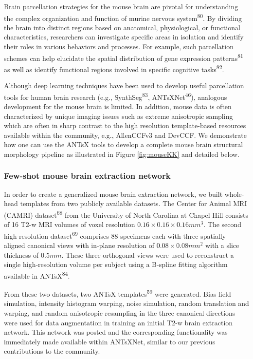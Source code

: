 \documentclass[
  12pt,
]{article}
\begin{document}
Brain parcellation strategies for the mouse brain are pivotal for
understanding the complex organization and function of murine nervous
system\textsuperscript{80}. By dividing the brain into distinct regions
based on anatomical, physiological, or functional characteristics,
researchers can investigate specific areas in isolation and identify
their roles in various behaviors and processes. For example, such
parcellation schemes can help elucidate the spatial distribution of gene
expression patterns\textsuperscript{81} as well as identify functional
regions involved in specific cognitive tasks\textsuperscript{82}.

Although deep learning techniques have been used to develop useful
parcellation tools for human brain research (e.g.,
SynthSeg\textsuperscript{83}, ANTsXNet\textsuperscript{46}), analogous
development for the mouse brain is limited. In addition, mouse data is
often characterized by unique imaging issues such as extreme anisotropic
sampling which are often in sharp contrast to the high resolution
template-based resources available within the community, e.g.,
AllenCCFv3 and DevCCF. We demonstrate how one can use the ANTsX tools to
develop a complete mouse brain structural morphology pipeline as
illustrated in Figure \ref{fig:mouseKK} and detailed below.

\subsubsection{Few-shot mouse brain extraction
network}\label{few-shot-mouse-brain-extraction-network}

In order to create a generalized mouse brain extraction network, we
built whole-head templates from two publicly available datasets. The
Center for Animal MRI (CAMRI) dataset\textsuperscript{68} from the
University of North Carolina at Chapel Hill consists of 16 T2-w MRI
volumes of voxel resolution \(0.16
\times 0.16 \times 0.16 mm^3\). The second high-resolution
dataset\textsuperscript{69} comprises 88 specimens each with three
spatially aligned canonical views with in-plane resolution of
\(0.08 \times 0.08 mm^2\) with a slice thickness of \(0.5 mm\). These
three orthogonal views were used to reconstruct a single high-resolution
volume per subject using a B-spline fitting algorithm available in
ANTsX\textsuperscript{84}.

From these two datasets, two ANTsX templates\textsuperscript{59} were
generated. Bias field simulation, intensity histogram warping, noise
simulation, random translation and warping, and random anisotropic
resampling in the three canonical directions were used for data
augmentation in training an initial T2-w brain extraction network. This
network was posted and the corresponding functionality was immediately
made available within ANTsXNet, similar to our previous contributions to
the community.
\end{document}
